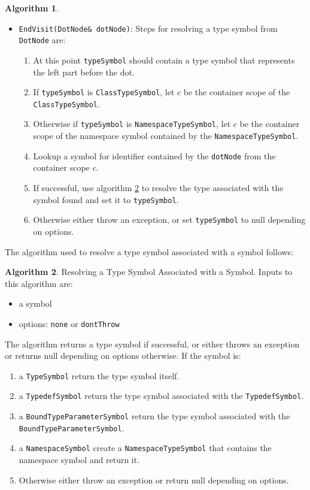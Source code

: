 \documentclass[a4paper,oneside,11pt]{book}
\theoremstyle{definition}
\newtheorem{algo}{Algorithm}[section]
\begin{document}
\begin{algo}
\begin{itemize}
\item
\verb|EndVisit(DotNode& dotNode)|:
Steps for resolving a type symbol from \verb|DotNode| are:
\begin{enumerate}
\item
At this point \verb|typeSymbol| should contain a type symbol that represents the left part before the dot.
\item
If \verb|typeSymbol| is \verb|ClassTypeSymbol|, let $c$ be the container scope of the\\
\verb|ClassTypeSymbol|.
\item
Otherwise if \verb|typeSymbol| is \verb|NamespaceTypeSymbol|, let $c$ be the container scope of the namespace symbol contained by the \verb|NamespaceTypeSymbol|.\item
Lookup a symbol for identifier contained by the \verb|dotNode| from the container scope $c$.
\item
If successful, use algorithm \ref{resolvesymboltype} to resolve the type associated with the symbol found and set it to \verb|typeSymbol|.
\item
Otherwise either throw an exception, or set \verb|typeSymbol| to null depending on options.
\end{enumerate}
\end{itemize}
\end{algo}

The algorithm used to resolve a type symbol associated with a symbol follows:

\begin{algo}\label{resolvesymboltype} Resolving a Type Symbol Associated with a Symbol.
Inputs to this algorithm are:
\begin{itemize}
\item
a symbol
\item
options: \verb|none| or \verb|dontThrow|
\end{itemize}
The algorithm returns a type symbol if successful, or either throws an exception or returns null depending on options otherwise.
If the symbol is:
\begin{enumerate}
\item
a \verb|TypeSymbol| return the type symbol itself.
\item
a \verb|TypedefSymbol| return the type symbol associated with the \verb|TypedefSymbol|.
\item
a \verb|BoundTypeParameterSymbol| return the type symbol associated with the\\
\verb|BoundTypeParameterSymbol|.
\item
a \verb|NamespaceSymbol| create a \verb|NamespaceTypeSymbol| that contains the namespace symbol and return it.
\item
Otherwise either throw an exception or return null depending on options.
\end{enumerate}
\end{algo}
\end{document}
